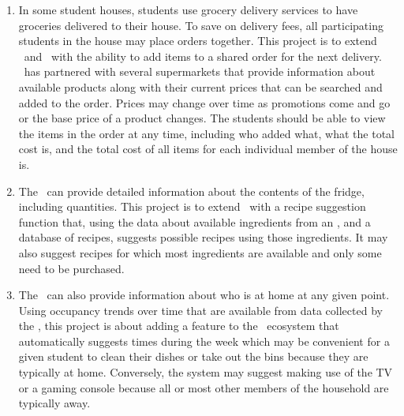 \begin{enumerate}
    \item In some student houses, students use grocery delivery services to have groceries delivered to their house. To save on delivery fees, all participating students in the house may place orders together. This project is to extend \sshConsole\ and \sshApp\ with the ability to add items to a shared order for the next delivery. \sshShortName\ has partnered with several supermarkets that provide information about available products along with their current prices that can be searched and added to the order. Prices may change over time as promotions come and go or the base price of a product changes. The students should be able to view the items in the order at any time, including who added what, what the total cost is, and the total cost of all items for each individual member of the house is.

    \item The \sshCamera\ can provide detailed information about the contents of the fridge, including quantities. This project is to extend \sshCloud\ with a recipe suggestion function that, using the data about available ingredients from an \sshCamera, and a database of recipes, suggests possible recipes using those ingredients. It may also suggest recipes for which most ingredients are available and only some need to be purchased.

    \item The \sshCamera\ can also provide information about who is at home at any given point. Using occupancy trends over time that are available from data collected by the \sshCamera, this project is about adding a feature to the \ssh\ ecosystem that automatically suggests times during the week which may be convenient for a given student to clean their dishes or take out the bins because they are typically at home. Conversely, the system may suggest making use of the TV or a gaming console because all or most other members of the household are typically away.
\end{enumerate}

\subsubsection{\higherEdFullName}

